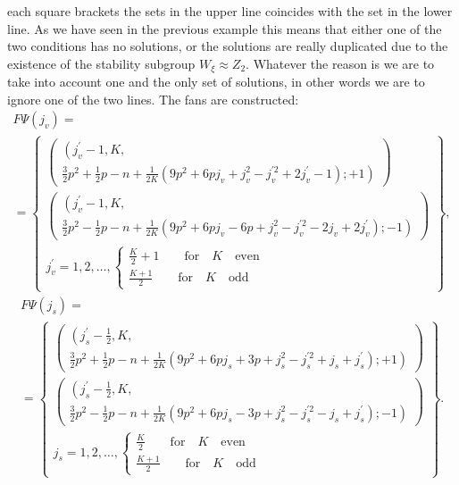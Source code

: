 \documentclass{article}
\begin{document}
each square brackets the sets in the upper line coincides with the set in
the lower line. As we have seen in the previous example this means that
either one of the two conditions has no solutions, or the solutions are
really duplicated due to the existence of the stability subgroup $W_{\xi
}\approx Z_{2}$. Whatever the reason is we are to take into account one and
the only set of solutions, in other words we are to ignore one of the two
lines. The fans are constructed:
\begin{multline*}
F\Psi \left( j_{v}\right) = \\
=\left\{
\begin{array}{c}
\left(
\begin{array}{c}
\left( {}\right. j_{v}^{\prime }-1,K, \\
\frac{3}{2}p^{2}+\frac{1}{2}p-n+\frac{1}{2K}\left(
9p^{2}+6pj_{v}+j_{v}^{2}-j_{v}^{\prime 2}+2j_{v}^{\prime }-1\right)
;+1\left. {}\right)
\end{array}
\right)  \\
\left(
\begin{array}{c}
\left( {}\right. j_{v}^{\prime }-1,K, \\
\frac{3}{2}p^{2}-\frac{1}{2}p-n+\frac{1}{2K}\left(
9p^{2}+6pj_{v}-6p+j_{v}^{2}-j_{v}^{\prime 2}-2j_{v}+2j_{v}^{\prime }\right)
;-1\left. {}\right)
\end{array}
\right)  \\
j_{v}^{\prime }=1,2,\ldots ,\left\{
\begin{array}{c}
\frac{K}{2}+1\qquad \mathrm{for\quad }K\mathrm{\quad even} \\
\frac{K+1}{2}\qquad \mathrm{for\quad }K\mathrm{\quad odd}
\end{array}
\right.
\end{array}
\right\} ,
\end{multline*}
\begin{multline*}
F\Psi \left( j_{s}\right) = \\
=\left\{
\begin{array}{c}
\left(
\begin{array}{c}
\left( {}\right. j_{s}^{\prime }-\frac{1}{2},K, \\
\frac{3}{2}p^{2}+\frac{1}{2}p-n+\frac{1}{2K}\left(
9p^{2}+6pj_{s}+3p+j_{s}^{2}-j_{s}^{\prime 2}+j_{s}+j_{s}^{\prime }\right)
;+1\left. {}\right)
\end{array}
\right)  \\
\left(
\begin{array}{c}
\left( {}\right. j_{s}^{\prime }-\frac{1}{2},K, \\
\frac{3}{2}p^{2}-\frac{1}{2}p-n+\frac{1}{2K}\left(
9p^{2}+6pj_{s}-3p+j_{s}^{2}-j_{s}^{\prime 2}-j_{s}+j_{s}^{\prime }\right)
;-1\left. {}\right)
\end{array}
\right)  \\
j_{s}=1,2,\ldots ,\left\{
\begin{array}{c}
\frac{K}{2}\qquad \mathrm{for\quad }K\mathrm{\quad even} \\
\frac{K+1}{2}\qquad \mathrm{for\quad }K\mathrm{\quad odd}
\end{array}
\right.
\end{array}
\right\} .
\end{multline*}
\end{document}

